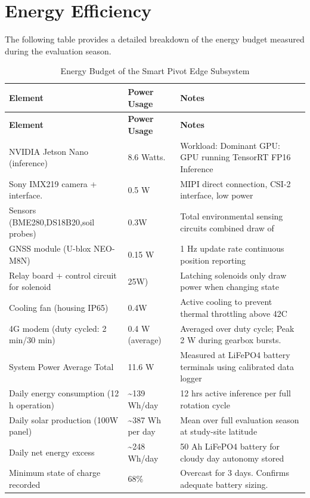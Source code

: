 \documentclass[12pt,a4paper]{report}
\renewcommand{\arraystretch}{1.25}
\begin{document}
\section{Energy Efficiency}

The following table provides a detailed breakdown of the energy budget measured during the evaluation season.

\begingroup
\small
\setlength{\parskip}{0pt}
\setlength{\tabcolsep}{4pt}
\renewcommand{\arraystretch}{1.2}
\begin{longtable}{|P{0.30\textwidth}|P{0.17\textwidth}|P{0.41\textwidth}|}
\caption{Energy Budget of the Smart Pivot Edge Subsystem}\\
\hline
\textbf{Element} & \textbf{Power Usage} & \textbf{Notes} \\ \hline
\endfirsthead
\hline
\textbf{Element} & \textbf{Power Usage} & \textbf{Notes} \\ \hline
\endhead
NVIDIA Jetson Nano (inference) & 8.6 Watts. & Workload: Dominant GPU: GPU running TensorRT FP16 Inference \\ \hline
Sony IMX219 camera + interface. & 0.5 W & MIPI direct connection, CSI-2 interface, low power \\ \hline
Sensors (BME280,DS18B20,soil probes) & 0.3W & Total environmental sensing circuits combined draw of \\ \hline
GNSS module (U-blox NEO-M8N) & 0.15 W & 1 Hz update rate continuous position reporting \\ \hline
Relay board + control circuit for solenoid & 25W) & Latching solenoids only draw power when changing state \\ \hline
Cooling fan (housing IP65) & 0.4W & Active cooling to prevent thermal throttling above 42\textdegree{}C \\ \hline
4G modem (duty cycled: 2 min/30 min) & 0.4 W (average) & Averaged over duty cycle; Peak 2 W during gearbox bursts. \\ \hline
System Power Average Total & 11.6 W & Measured at LiFePO4 battery terminals using calibrated data logger \\ \hline
Daily energy consumption (12 h operation) & \textasciitilde{}139 Wh/day & 12 hrs active inference per full rotation cycle \\ \hline
Daily solar production (100W panel) & \textasciitilde{}387 Wh per day & Mean over full evaluation season at study-site latitude \\ \hline
Daily net energy excess & \textasciitilde{}248 Wh/day & 50 Ah LiFePO4 battery for cloudy day autonomy stored \\ \hline
Minimum state of charge recorded & 68\% & Overcast for 3 days. Confirms adequate battery sizing. \\ \hline
\end{longtable}
\endgroup
\end{document}
